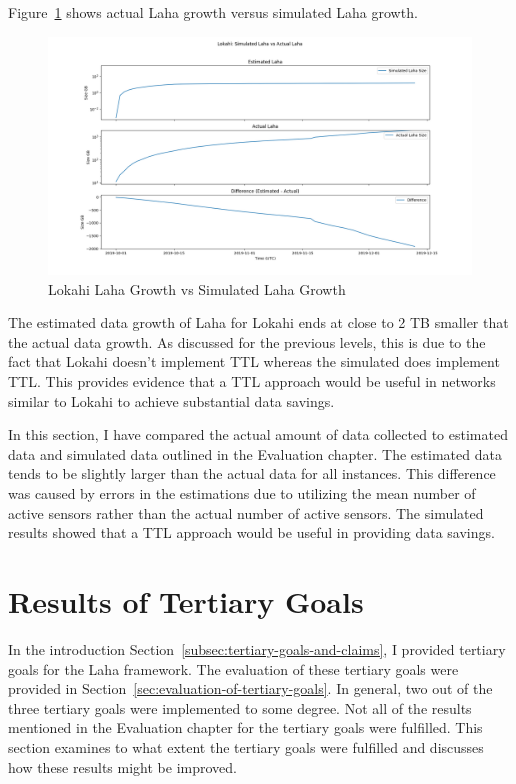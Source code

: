 Figure~\ref{fig:lokahi_actual_laha_vs_sim} shows actual Laha growth versus simulated Laha growth.

\begin{figure}[H]
    \centering
    \includegraphics[width=\linewidth]{figures/lokahi_actual_laha_vs_sim.png}
    \caption{Lokahi Laha Growth vs Simulated Laha Growth}
    \label{fig:lokahi_actual_laha_vs_sim}
\end{figure}

The estimated data growth of Laha for Lokahi ends at close to 2 TB smaller that the actual data growth. As discussed for the previous levels, this is due to the fact that Lokahi doesn't implement TTL whereas the simulated does implement TTL. This provides evidence that a TTL approach would be useful in networks similar to Lokahi to achieve substantial data savings.

In this section, I have compared the actual amount of data collected to estimated data and simulated data outlined in the Evaluation chapter. The estimated data tends to be slightly larger than the actual data for all instances. This difference was caused by errors in the estimations due to utilizing the mean number of active sensors rather than the actual number of active sensors. The simulated results showed that a TTL approach would be useful in providing data savings.

\section{Results of Tertiary Goals}\label{sec:results-of-tertiary-goals}

In the introduction Section~\ref{subsec:tertiary-goals-and-claims}, I provided tertiary goals for the Laha framework. The evaluation of these tertiary goals were provided in Section~\ref{sec:evaluation-of-tertiary-goals}. In general, two out of the three tertiary goals were implemented to some degree. Not all of the results mentioned in the Evaluation chapter for the tertiary goals were fulfilled. This section examines to what extent the tertiary goals were fulfilled and discusses how these results might be improved.


